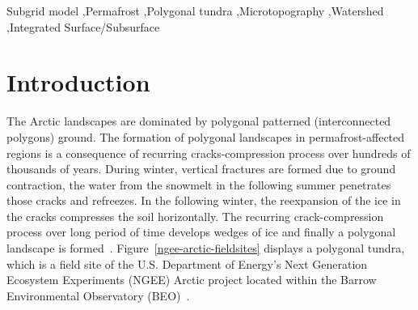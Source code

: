 \documentclass[review,11pt]{elsarticle}
\begin{document}
\begin{frontmatter}
\begin{keyword}
Subgrid model \sep Permafrost \sep Polygonal tundra \sep  Microtopography  \sep Watershed \sep Integrated Surface/Subsurface
\end{keyword}


\end{frontmatter}

\linenumbers
\FloatBarrier
\section{Introduction}\label{introduction}
The Arctic landscapes are dominated by polygonal patterned (interconnected polygons) ground. The formation of polygonal landscapes in permafrost-affected regions is a consequence of recurring cracks-compression process over hundreds of thousands of years. During winter, vertical fractures are formed due to ground contraction, the water from the snowmelt in the following summer penetrates those cracks and refreezes. In the following winter, the reexpansion of the ice in the cracks compresses the soil horizontally. The recurring crack-compression process over long period of time develops wedges of ice and finally a polygonal landscape is formed~\cite{lachenbruch1962mechanics,greene1963contraction,mackay1990some,mackay2004thermally}. Figure~\ref{ngee-arctic-fieldsites} displays a polygonal tundra, which is a field site of the U.S. Department of Energy's Next Generation Ecosystem Experiments (NGEE) Arctic project located within the Barrow Environmental Observatory (BEO)~\cite{kumar2016modeling}.
\end{document}
